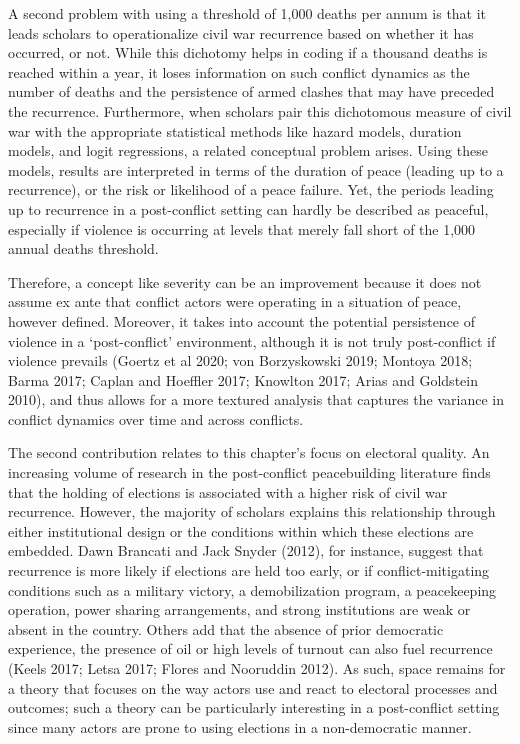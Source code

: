 \documentclass [11pt]{article}
\begin{document}
A second problem with using a threshold of 1,000 deaths per annum is that it leads scholars to operationalize civil war recurrence based on whether it has occurred, or not. While this dichotomy helps in coding if a thousand deaths is reached within a year, it loses information on such conflict dynamics as the number of deaths and the persistence of armed clashes that may have preceded the recurrence. Furthermore, when scholars pair this dichotomous measure of civil war with the appropriate statistical methods like hazard models, duration models, and logit regressions, a related conceptual problem arises. Using these models, results are interpreted in terms of the duration of peace (leading up to a recurrence), or the risk or likelihood of a peace failure. Yet, the periods leading up to recurrence in a post-conflict setting can hardly be described as peaceful, especially if violence is occurring at levels that merely fall short of the 1,000 annual deaths threshold.

Therefore, a concept like severity can be an improvement because it does not assume ex ante that conflict actors were operating in a situation of peace, however defined. Moreover, it takes into account the potential persistence of violence in a `post-conflict' environment, although it is not truly post-conflict if violence prevails (Goertz et al 2020; von Borzyskowski 2019; Montoya 2018; Barma 2017; Caplan and Hoeffler 2017; Knowlton 2017; Arias and Goldstein 2010), and thus allows for a more textured analysis that captures the variance in conflict dynamics over time and across conflicts.

The second contribution relates to this chapter's focus on electoral quality. An increasing volume of research in the post-conflict peacebuilding literature finds that the holding of elections is associated with a higher risk of civil war recurrence. However, the majority of scholars explains this relationship through either institutional design or the conditions within which these elections are embedded. Dawn Brancati and Jack Snyder (2012), for instance, suggest that recurrence is more likely if elections are held too early, or if conflict-mitigating conditions such as a military victory, a demobilization program, a peacekeeping operation, power sharing arrangements, and strong institutions are weak or absent in the country. Others add that the absence of prior democratic experience, the presence of oil or high levels of turnout can also fuel recurrence (Keels 2017; Letsa 2017; Flores and Nooruddin 2012). As such, space remains for a theory that focuses on the way actors use and react to electoral processes and outcomes; such a theory can be particularly interesting in a post-conflict setting since many actors are prone to using elections in a non-democratic manner.
\end{document}
